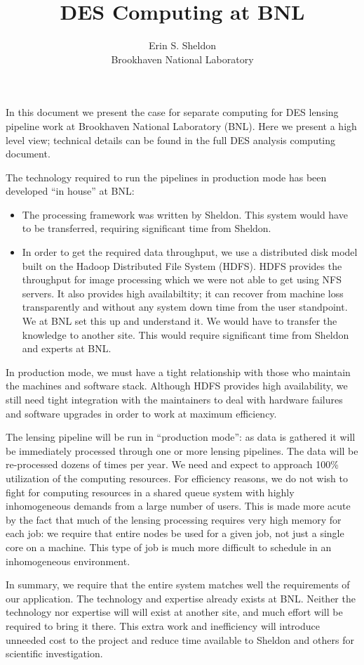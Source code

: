 \documentclass[12pt]{article}
\title{DES Computing at BNL}
\author{Erin S. Sheldon\\
Brookhaven National Laboratory}
\date{}
\begin{document}
\maketitle

In this document we present the case for separate computing for DES lensing
pipeline work at Brookhaven National Laboratory (BNL).  Here we present a high
level view; technical details can be found in the full DES analysis computing
document.

The technology required to run the pipelines in production mode has been
developed ``in house'' at BNL:  
\begin{itemize}

    \item The processing framework was written by Sheldon. This system would
    have to be transferred, requiring significant time from Sheldon.

    \item In order to get the required data throughput, we use a distributed
    disk model built on the Hadoop Distributed File System (HDFS).  HDFS
    provides the throughput for image processing which we were not able to get
    using NFS servers.  It also provides high availabiltity; it can recover
    from machine loss transparently and without any system down time from the
    user standpoint.  We at BNL set this up and understand it. We would have to
    transfer the knowledge to another site.  This would require significant
    time from Sheldon and experts at BNL.
    
\end{itemize}

In production mode, we must have a tight relationship with those who maintain
the machines and software stack.  Although HDFS provides high availability, we
still need tight integration with the maintainers to deal with hardware
failures and software upgrades in order to work at maximum efficiency.  

The lensing pipeline will be run in ``production mode'': as data is gathered it
will be immediately processed through one or more lensing pipelines.  The data
will be re-processed dozens of times per year.  We need and expect to approach
100\% utilization of the computing resources.  For efficiency reasons, we do
not wish to fight for computing resources in a shared queue system with highly
inhomogeneous demands from a large number of users.  This is made more acute by
the fact that much of the lensing processing requires very high memory for each
job: we require that entire nodes be used for a given job, not just a single
core on a machine.  This type of job is much more difficult to schedule in an
inhomogeneous environment.

In summary, we require that the entire system matches well the requirements of
our application.   The technology and expertise already exists at BNL.  Neither
the technology nor expertise will will exist at another site, and much effort
will be required to bring it there.  This extra work and inefficiency will
introduce unneeded cost to the project and reduce time available to Sheldon and
others for scientific investigation.
\end{document}
